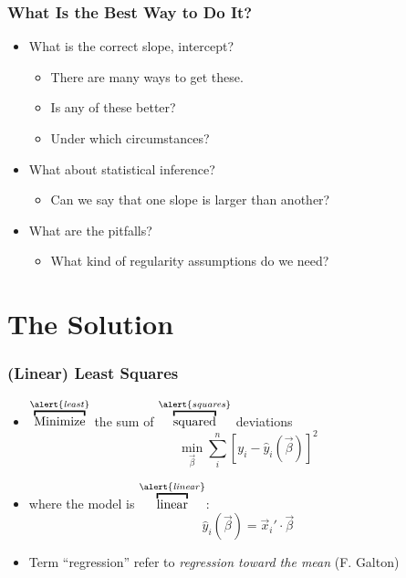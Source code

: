 \documentclass[mathserif, xcolor=table, svgnames]{beamer}
\begin{document}
\begin{frame}
  \frametitle{What Is the Best Way to Do It?}
  \begin{itemize}
  \item What is the correct slope, intercept?
    \begin{itemize}
    \item There are many ways to get these.
    \item Is any of these better?
    \item Under which circumstances?
    \end{itemize}
  \item What about statistical inference?
    \begin{itemize}
    \item Can we say that one slope is larger than another?
    \end{itemize}
  \item What are the pitfalls?
    \begin{itemize}
    \item What kind of regularity assumptions do we need?
    \end{itemize}
  \end{itemize}
\end{frame}

\section[Solution]{The Solution}

\begin{frame}
  \frametitle{(Linear) Least Squares}
  \begin{itemize}
  \item $\overbracket{\text{Minimize}}^{\text{\alert{\emph{least}}}}$
    the sum of 
    $\overbracket{\text{squared}}^{\text{\alert{\emph{squares}}}}$
    deviations
    \begin{equation*}
      \min_{\vec{\beta}}
      \sum_{i}^{n} [ y_{i} - \hat y_{i} (\vec{\beta})]^{2}
    \end{equation*}
  \item where the model is $\overbracket{\text{linear}}^{\text{\alert{\emph{linear}}}}$:
    \begin{equation*}
      \hat y_{i}(\vec{\beta}) = \vec{x}_{i}' \cdot \vec{\beta}
    \end{equation*}
  \item Term ``regression'' refer to \emph{regression toward the mean}
    (F. Galton)
  \end{itemize}
\end{frame}
\end{document}
